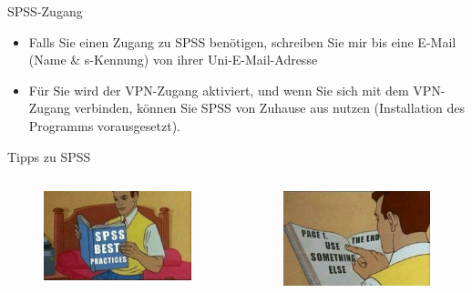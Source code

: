 \documentclass[11pt]{beamer}
\begin{document}
\begin{frame}[t]{SPSS-Zugang}
	\begin{itemize}
		\item Falls Sie einen Zugang zu SPSS benötigen, schreiben Sie mir bis  eine E-Mail (Name \& s-Kennung) von ihrer Uni-E-Mail-Adresse
		\item Für Sie wird der VPN-Zugang aktiviert, und wenn Sie sich mit dem VPN-Zugang verbinden, können Sie SPSS von Zuhause aus nutzen (Installation des Programms vorausgesetzt). 
	\end{itemize}
\end{frame}

\begin{frame}{Tipps zu SPSS}
	\begin{columns}
		\begin{column}{0.5\textwidth}
			\begin{center}
				\begin{figure}[ht]
					\includegraphics[width=\textwidth]{pics/pre11.png} \pause
				\end{figure}	
			\end{center}
		\end{column}
		\begin{column}{0.5\textwidth}
			\begin{center}
				\begin{figure}[ht]
					\includegraphics[width=\textwidth]{pics/pre12.png}
				\end{figure}	
			\end{center}		
		\end{column}
				

\end{columns}
\end{frame}
\end{document}
